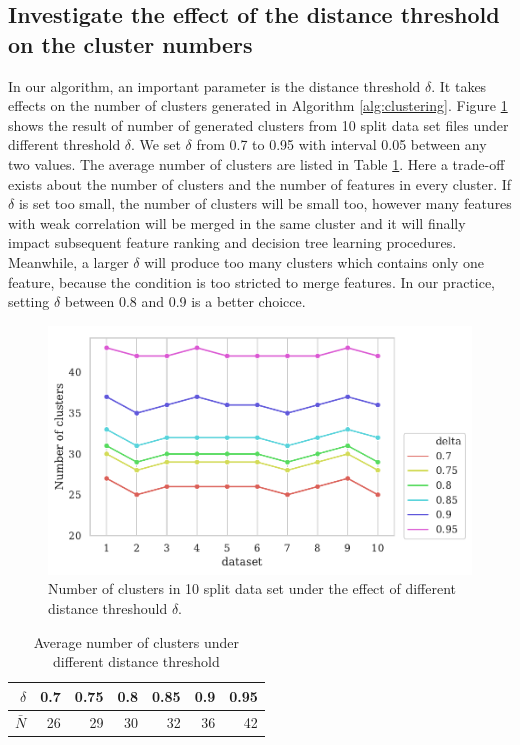 \documentclass{ieeeaccess}
\theoremstyle{definition}
\begin{document}
\subsection{Investigate the effect of the distance threshold on the cluster numbers}

In our algorithm, an important parameter is the distance threshold $\delta$. It takes effects on the number of clusters generated in Algorithm \ref{alg:clustering}. Figure \ref{fig:different-threshold} shows the result of number of generated clusters from 10 split data set files under different threshold $\delta$. We set $\delta$ from 0.7 to 0.95 with interval 0.05 between any two values. The average number of clusters are listed in Table \ref{tab:mean-cluster-number}. Here a trade-off exists about the number of clusters and the number of features in every cluster. If $\delta$ is set too small, the number of clusters will be small too, however many features with weak correlation will be merged in the same cluster and it will finally impact subsequent feature ranking and decision tree learning procedures. Meanwhile, a larger $\delta$ will produce too many clusters which contains only one feature, because the condition is too stricted to merge features. In our practice, setting $\delta$ between 0.8 and 0.9 is a better choicce.

\begin{figure}
    \centering
    \includegraphics[scale=0.5]{fig/Cluster-Number-in-diff-delta.pdf}
    \caption{Number of clusters in 10 split data set under the effect of different distance threshould $\delta$. }
    \label{fig:different-threshold}
\end{figure}

\begin{table}
    \caption{Average number of clusters under different distance threshold}
    \label{tab:mean-cluster-number}
    \centering
    \begin{tabular}{r|rrrrrr}
        \toprule
        $\delta$ & 0.7 & 0.75 & 0.8 & 0.85 & 0.9 & 0.95 \\
        \midrule
        $\bar{N}$ & 26 & 29 & 30 & 32 & 36 & 42 \\
        \bottomrule
    \end{tabular}
\end{table}
\end{document}
